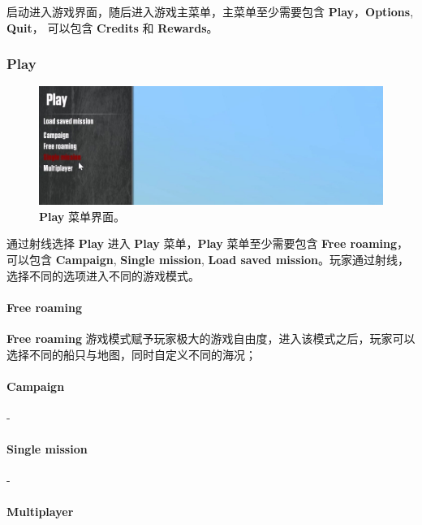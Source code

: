 \documentclass[letterpaper,10pt]{article}
\begin{document}
			启动进入游戏界面，随后进入游戏主菜单，主菜单至少需要包含 \textbf{Play}，\textbf{Options}, \textbf{Quit}， 可以包含 \textbf{Credits} 和 \textbf{Rewards}。
			
				\subsubsection{Play}
				
				\begin{figure}[htbp]
					\centering 
					\includegraphics[width=\columnwidth]{picture/Play}
					\caption{
						\label{fig: Play} 
						\textbf{Play} 菜单界面。
					}
				\end{figure}
				
				通过射线选择 \textbf{Play} 进入 \textbf{Play} 菜单，\textbf{Play} 菜单至少需要包含 \textbf{Free roaming}， 可以包含 \textbf{Campaign}, \textbf{Single mission}, \textbf{Load saved mission}。玩家通过射线，选择不同的选项进入不同的游戏模式。
				
				\paragraph{Free roaming} 
				
				\textbf{Free roaming} 游戏模式赋予玩家极大的游戏自由度，进入该模式之后，玩家可以选择不同的船只与地图，同时自定义不同的海况；
				
				\paragraph{Campaign}
				
				-
				
				\paragraph{Single mission}
				
				-
				
				\paragraph{Multiplayer}
				
\end{document}
